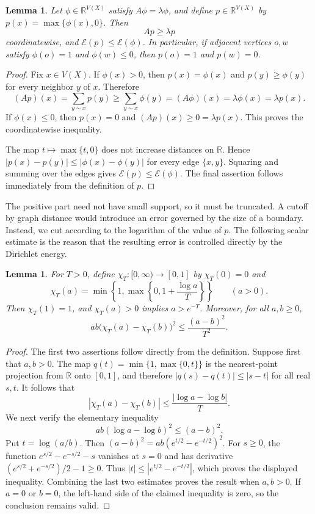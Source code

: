 \documentclass[11pt]{article}
\newtheorem{lemma}[theorem]{Lemma}
\theoremstyle{definition}
\theoremstyle{remark}
\begin{document}
\begin{lemma}\label{lem:positive-part}
Let $\phi\in\mathbb R^{V(X)}$ satisfy $A\phi=\lambda\phi$, and define $p\in\mathbb R^{V(X)}$ by $p(x)=\max\{\phi(x),0\}$. Then
\[
Ap\geq\lambda p
\]
coordinatewise, and $\mathcal E(p)\leq\mathcal E(\phi)$. In particular, if adjacent vertices $o,w$ satisfy $\phi(o)=1$ and $\phi(w)\leq0$, then $p(o)=1$ and $p(w)=0$.
\end{lemma}

\begin{proof}
Fix $x\in V(X)$. If $\phi(x)>0$, then $p(x)=\phi(x)$ and $p(y)\geq\phi(y)$ for every neighbor $y$ of $x$. Therefore
\[
(Ap)(x)=\sum_{y\sim x}p(y)\geq\sum_{y\sim x}\phi(y)=(A\phi)(x)=\lambda\phi(x)=\lambda p(x).
\]
If $\phi(x)\leq0$, then $p(x)=0$ and $(Ap)(x)\geq0=\lambda p(x)$. This proves the coordinatewise inequality.

The map $t\mapsto\max\{t,0\}$ does not increase distances on $\mathbb R$. Hence $|p(x)-p(y)|\leq|\phi(x)-\phi(y)|$ for every edge $\{x,y\}$. Squaring and summing over the edges gives $\mathcal E(p)\leq\mathcal E(\phi)$. The final assertion follows immediately from the definition of $p$.
\end{proof}

The positive part need not have small support, so it must be truncated. A cutoff by graph distance would introduce an error governed by the size of a boundary. Instead, we cut according to the logarithm of the value of $p$. The following scalar estimate is the reason that the resulting error is controlled directly by the Dirichlet energy.

\begin{lemma}\label{lem:scalar-log-cutoff}
For $T>0$, define $\chi_T:[0,\infty)\to[0,1]$ by $\chi_T(0)=0$ and
\[
\chi_T(a)=\min\left\{1,\max\left\{0,1+\frac{\log a}{T}\right\}\right\}
\qquad(a>0).
\]
Then $\chi_T(1)=1$, and $\chi_T(a)>0$ implies $a>e^{-T}$. Moreover, for all $a,b\geq0$,
\[
ab\bigl(\chi_T(a)-\chi_T(b)\bigr)^2\leq\frac{(a-b)^2}{T^2}.
\]
\end{lemma}

\begin{proof}
The first two assertions follow directly from the definition. Suppose first that $a,b>0$. The map $q(t)=\min\{1,\max\{0,t\}\}$ is the nearest-point projection from $\mathbb R$ onto $[0,1]$, and therefore $|q(s)-q(t)|\leq|s-t|$ for all real $s,t$. It follows that
\[
|\chi_T(a)-\chi_T(b)|\leq\frac{|\log a-\log b|}{T}.
\]
We next verify the elementary inequality
\[
ab(\log a-\log b)^2\leq(a-b)^2.
\]
Put $t=\log(a/b)$. Then $(a-b)^2=ab(e^{t/2}-e^{-t/2})^2$. For $s\geq0$, the function $e^{s/2}-e^{-s/2}-s$ vanishes at $s=0$ and has derivative $(e^{s/2}+e^{-s/2})/2-1\geq0$. Thus $|t|\leq|e^{t/2}-e^{-t/2}|$, which proves the displayed inequality. Combining the last two estimates proves the result when $a,b>0$. If $a=0$ or $b=0$, the left-hand side of the claimed inequality is zero, so the conclusion remains valid.
\end{proof}
\end{document}
